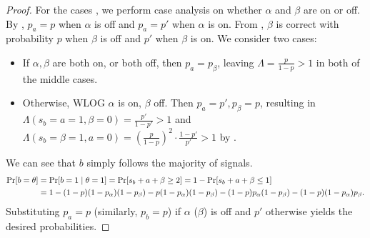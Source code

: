 \begin{proof}
    For the cases , we perform case analysis on whether $ \alpha $ and $ \beta $ are on or off.
    By , $p_a = p$ when $\alpha$ is off and $p_a = p'$ when $\alpha$ is on.
    From , $\beta$ is correct with probability $p$ when $\beta$ is off and $p'$ when $\beta$ is on.
    We consider two cases:
    \begin{itemize}[ ]
        \item If $ \alpha, \beta $ are both on, or both off, then $ p_a = p_\beta $, leaving $\Lambda = \frac p{1-p} > 1 $ in both of the middle cases.
        \item Otherwise, WLOG $ \alpha $ is on, $ \beta $ off.
            Then $ p_a = p', p_\beta = p $, resulting in $\Lambda( s_b= a=1, \beta=0) = \frac {p'}{1-{p'}} > 1 $ and $\Lambda( s_b= 
            \beta=1, a=0) = \left( \frac{p}{1-p} \right)^2 \cdot \frac {1-p'}{p'} > 1 $ by .
    \end{itemize}

    We can see that $ b $ simply follows the majority of signals.
    \begin{align*}
        \Pr\!\left[ b = \theta \right] &= \Pr\!\left[ b = 1 \mid \theta = 1 \right] = \Pr\!\left[ s_b + a + \beta \geq 2 \right] = 1-\Pr\!\left[ s_b + a + \beta \leq 1 \right] \\
                        &= 1 - (1-p)(1-p_\alpha)(1-p_\beta) - p(1-p_\alpha)(1-p_\beta) - (1-p)p_\alpha(1-p_\beta) - (1-p)(1-p_\alpha)p_\beta.
    \end{align*}
    Substituting $ p_a = p $ (similarly, $p_b = p$) if $ \alpha $ ($\beta$) is off and $ p' $ otherwise yields the desired probabilities.
\end{proof}

